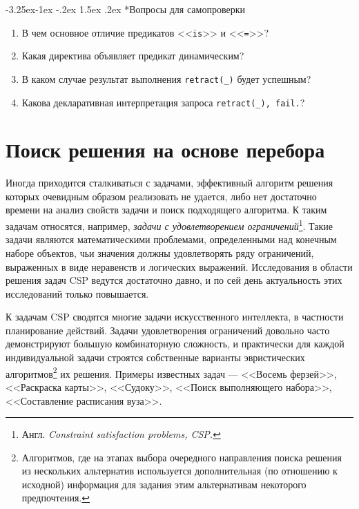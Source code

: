 \documentclass[12pt, openany, twoside]{book} %
\makeatletter
\renewcommand\subsubsection{\@startsection{subsubsection}{3}{\z@}%
                                     {-3.25ex\@plus -1ex \@minus -.2ex}%
                                     {1.5ex \@plus .2ex}%
                                     {\normalfont\normalsize\bfseries}}
\newenvironment{questions}{\subsubsection*{Вопросы для самопроверки}\begin{enumerate}}{\end{enumerate}}
\makeatother
\begin{document}
\begin{questions}
  \item{} В чем основное отличие предикатов <<\texttt{is}>> и <<\texttt{=}>>?
  \item{} Какая директива объявляет предикат динамическим?
  \item{} В каком случае результат выполнения \texttt{retract(\_)} будет ус\-пеш\-ным?
  \item{} Какова декларативная интерпретация запроса \texttt{retract(\_), fail.}?
\end{questions}

\chapter{Поиск решения на основе перебора}

Иногда приходится сталкиваться с задачами, эффективный алгоритм решения которых очевидным образом реализовать не удается, либо нет достаточно времени на анализ свойств задачи и поиск подходящего алгоритма. К таким задачам относятся, например, \emph{задачи с удовлетворением ограничений}\footnote{Англ. \emph{Constraint satisfaction problems, CSP.}}. Такие задачи являются математическими проблемами, определенными над конечным наборе объектов, чьи значения должны удовлетворять ряду ограничений, выраженных в виде неравенств и логических выражений. Исследования в области решения задач CSP ведутся достаточно давно, и по сей день актуальность этих исследований только повышается.

К задачам CSP сводятся многие задачи искусственного интеллекта, в частности планирование действий. Задачи удовлетворения ограничений довольно часто демонстрируют большую комбинаторную сложность, и практически для каждой индивидуальной задачи строятся собственные варианты эвристических алгоритмов\footnote{Алгоритмов, где на этапах выбора очередного направления поиска решения из нескольких альтернатив используется дополнительная (по отношению к исходной) информация для задания этим альтернативам некоторого предпочтения.} их решения. Примеры известных задач --- <<Восемь ферзей>>, <<Раскраска карты>>, <<Судоку>>, <<Поиск выполняющего набора>>, <<Составление расписания вуза>>.
\end{document}
